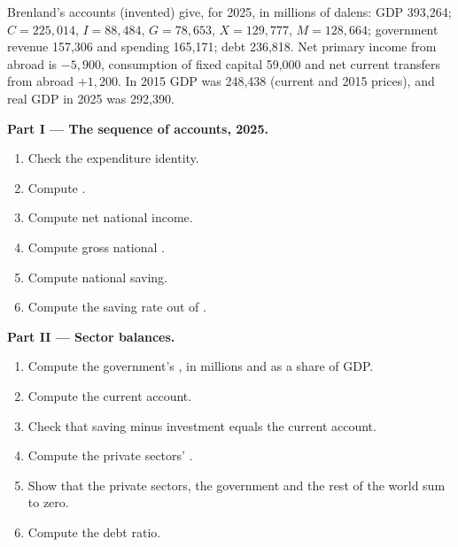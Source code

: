 \begin{problem}\label{pb:b1:national-accounts-in-depth:rebase}
Brenland's accounts (invented) give, for 2025, in millions of dalens: GDP
393,264; $C = 225{,}014$, $I = 88{,}484$, $G = 78{,}653$, $X = 129{,}777$, $M = 128{,}664$; government
revenue 157,306 and spending 165,171; debt 236,818. Net primary income from
abroad is $-5{,}900$, consumption of fixed capital 59,000 and net current
transfers from abroad $+1{,}200$. In 2015 GDP was 248,438 (current and 2015
prices), and real GDP in 2025 was 292,390.

\medskip\noindent\textbf{Part I --- The sequence of accounts, 2025.}
\begin{enumerate}
  \item Check the expenditure identity.
  \item Compute .
  \item Compute net national income.
  \item Compute gross national .
  \item Compute national saving.
  \item Compute the saving rate out of .
\end{enumerate}

\medskip\noindent\textbf{Part II --- Sector balances.}
\begin{enumerate}[resume]
  \item Compute the government's , in millions and as a share of GDP.
  \item Compute the current account.
  \item Check that saving minus investment equals the current account.
  \item Compute the private sectors' .
  \item Show that the private sectors, the government and the rest of the world sum to zero.
  \item Compute the debt ratio.
\end{enumerate}


\end{problem}
